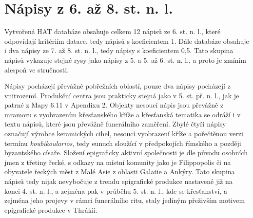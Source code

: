 
\section[nápisy-z-6.-až-8.-st.-n.-l.]{Nápisy z 6. až 8. st. n. l.}

Vytvořená HAT databáze obsahuje celkem 12 nápisů ze 6. st. n. l., které odpovídají kritériím datace, tedy nápisů s koeficientem 1. Dále databáze obsahuje i dva nápisy ze 7. až 8. st. n. l., tedy nápisy s koeficientem 0,5. Tato skupina nápisů vykazuje stejné rysy jako nápisy z 5. a 5. až 6. st. n. l., a proto je zmíním alespoň ve stručnosti.

Nápisy pocházejí převážně pobřežních oblastí, pouze dva nápisy pocházejí z vnitrozemí. Produkční centra jsou prakticky stejná jako v 5. st. př. n. l., jak je patrné z Mapy 6.11 v Apendixu 2. Objekty nesoucí nápis jsou převážně z mramoru s vyobrazením křesťanského kříže a křesťanská tematika se odráží i v textu nápisů, které jsou převážně funerálního zaměření. Zbylé čtyři nápisy označují výrobce keramických cihel, nesoucí vyobrazení kříže a pořečtěnou verzi termínu {\em koubikoularios}, tedy eunuch sloužící v předpokojích římského a později byzantského císaře. Složení epigraficky aktivní společnosti je dle původu osobních jmen z třetiny řecké, s odkazy na místní komunity jako je Filippopolis či na obyvatele řeckých měst z Malé Asie z oblasti Galatie a Ankýry. Tato skupina nápisů tedy nijak nevybočuje z trendu epigrafické produkce nastavené již na konci 4. st. n. l., a zejména pak v průběhu 5. st. n. l., kde se křesťanství, a zejména jeho projevy v rámci funerálního ritu, staly jediným přeživším motivem epigrafické produkce v Thrákii.

